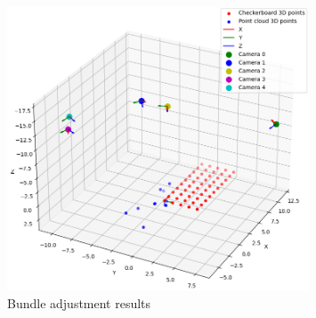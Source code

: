 \documentclass{article}
\begin{document}
\begin{figure}[h]
    \centering
    \includegraphics[width=0.8\textwidth]{images/bundle_adjustment_results.png}
    \caption{Bundle adjustment results}
    \label{fig:bundle_adjustment_results}
\end{figure}
\end{document}
